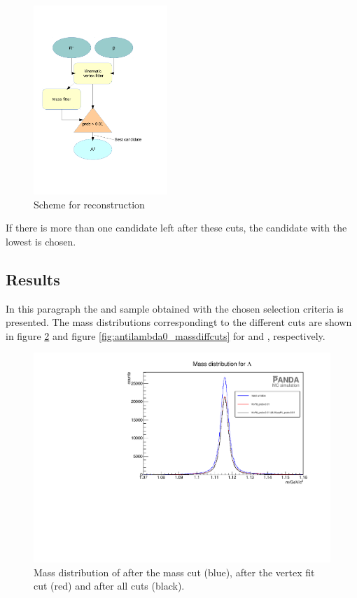 		\begin{figure}
			\centering
				\includegraphics[width=0.45\textwidth]{./plots/combineLambda0.pdf}
			\caption{\propose Scheme for \lam reconstruction}
			\label{fig:lambda_scheme}
		\end{figure}
		
		If there is more than one candidate left after these cuts, the candidate with the lowest \chisq is chosen.
		
		
	\subsection*{Results}
		In this paragraph the \lam and \alam sample obtained with the chosen selection criteria is presented.
		The mass distributions correspondingt to the different cuts are shown in figure \ref{fig:lambda0_massdiffcuts} 
		and figure \ref{fig:antilambda0_massdiffcuts} for \lam and \alam, respectively.
	
		\begin{figure}
			\centering
				\includegraphics[width=1.1\textwidth]{./plots/lambda0/lambda0_m_diffcuts.pdf}
			\caption{\propose Mass distribution of \lam after the mass cut (blue), after the vertex fit cut (red) and after all cuts (black).}
			\label{fig:lambda0_massdiffcuts}
		\end{figure}
			
